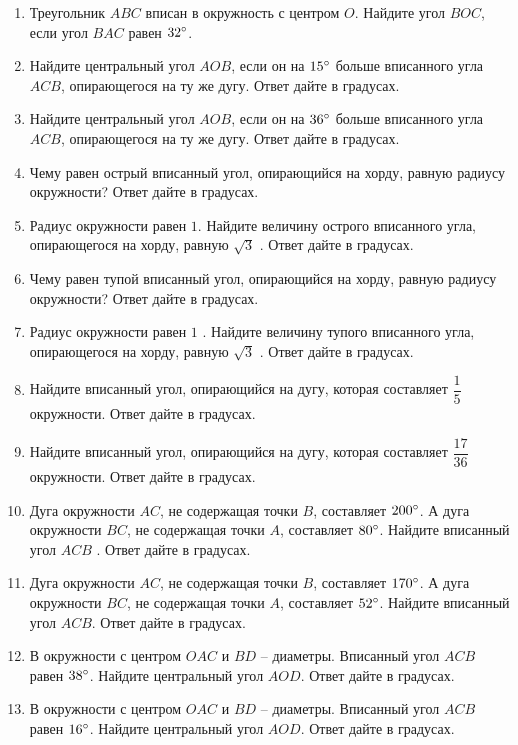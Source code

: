 \documentclass[12pt, a4paper]{article}
\begin{document}
	\begin{enumerate}
		\item Треугольник \( ABC \)  вписан в окружность с центром \( O \). Найдите угол \( BOC \), если угол \( BAC  \) равен \( 32\degree\).
		\item Найдите центральный угол \( AOB \), если он на \( 15 \degree\)  больше вписанного угла \( ACB \), опирающегося на ту же дугу. Ответ дайте в градусах.
		\item Найдите центральный угол \( AOB \), если он на \( 36  \degree\)  больше вписанного угла \( ACB \), опирающегося на ту же дугу. Ответ дайте в градусах.
		\item Чему равен острый вписанный угол, опирающийся на хорду, равную радиусу окружности? Ответ дайте в градусах.
		\item Радиус окружности равен \( 1 \). Найдите величину острого вписанного угла, опирающегося на хорду, равную \( \sqrt{3} \) . Ответ дайте в градусах.
		\item Чему равен тупой вписанный угол, опирающийся на хорду, равную радиусу окружности? Ответ дайте в градусах.
		\item Радиус окружности равен \( 1 \) . Найдите величину тупого вписанного угла, опирающегося на хорду, равную \( \sqrt{3} \) . Ответ дайте в градусах.
		\item Найдите вписанный угол, опирающийся на дугу, которая составляет \( \dfrac{1}{5} \)  окружности. Ответ дайте в градусах.
		\item Найдите вписанный угол, опирающийся на дугу, которая составляет \( \dfrac{17}{36} \)  окружности. Ответ дайте в градусах.
		\item Дуга окружности \( AC \), не содержащая точки \( B \), составляет \( 200\degree \). А дуга окружности \( BC \), не содержащая точки \( A \), составляет \( 80\degree \). Найдите вписанный угол \( ACB \) . Ответ дайте в градусах.
		\item Дуга окружности \( AC \), не содержащая точки \( B \), составляет \( 170\degree \). А дуга окружности \( BC \), не содержащая точки \( A \), составляет \( 52 \degree\). Найдите вписанный угол \( ACB \). Ответ дайте в градусах.
		\item В окружности с центром \( O AC \) и \( BD \) – диаметры. Вписанный угол \( ACB \)  равен \( 38 \degree \). Найдите центральный угол \( AOD \). Ответ дайте в градусах.
		\item В окружности с центром \( O AC \) и \( BD \) – диаметры. Вписанный угол \( ACB \)  равен \( 16 \degree \). Найдите центральный угол \( AOD \). Ответ дайте в градусах.

\end{enumerate}
\end{document}

